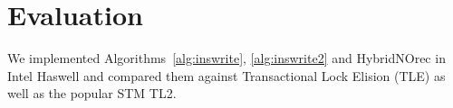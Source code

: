 \section{Evaluation}
\label{sec:eval}
%
We implemented Algorithms~\ref{alg:inswrite}, \ref{alg:inswrite2} and HybridNOrec in Intel Haswell and compared them against
Transactional Lock Elision (TLE) as well as the popular STM TL2.